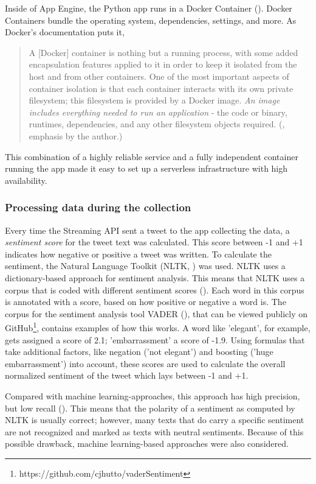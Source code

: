 Inside of App Engine, the Python app runs in a Docker Container (\cite{merkel2014docker}). Docker Containers bundle the operating system, dependencies, settings, and more. As Docker's documentation puts it,

\begin{quote}
    A [Docker] container is nothing but a running process, with some added encapsulation features applied to it in order to keep it isolated from the host and from other containers. One of the most important aspects of container isolation is that each container interacts with its own private filesystem; this filesystem is provided by a Docker image. \emph{An image includes everything needed to run an application} - the code or binary, runtimes, dependencies, and any other filesystem objects required. (\cite{dockerOrientationSetup2020}, emphasis by the author.)
\end{quote}

This combination of a highly reliable service and a fully independent container running the app made it easy to set up a serverless infrastructure with high availability.

\subsubsection{Processing data during the collection}
Every time the Streaming API sent a tweet to the app collecting the data, a \emph{sentiment score} for the tweet text was calculated. This score between -1 and +1 indicates how negative or positive a tweet was written. To calculate the sentiment, the Natural Language Toolkit (NLTK, \cite{loper2002nltk}) was used. NLTK uses a dictionary-based approach for sentiment analysis. This means that NLTK uses a corpus that is coded with different sentiment scores (\cite{haselmayer2017sentiment}). Each word in this corpus is annotated with a score, based on how positive or negative a word is. The corpus for the sentiment analysis tool VADER (\cite{gilbert2014vader}), that can be viewed publicly on GitHub\footnote{https://github.com/cjhutto/vaderSentiment}, contains examples of how this works. A word like 'elegant', for example, gets assigned a score of 2.1; 'embarrassment' a score of -1.9. Using formulas that take additional factors, like negation ('not elegant') and boosting ('huge embarrassment') into account, these scores are used to calculate the overall normalized sentiment of the tweet which lays between -1 and +1.

Compared with machine learning-approaches, this approach has high precision, but low recall (\cite{sorokaBadNewsMad2015}). This means that the polarity of a sentiment as computed by NLTK is usually correct; however, many texts that do carry a specific sentiment are not recognized and marked as texts with neutral sentiments. Because of this possible drawback, machine learning-based approaches were also considered.

